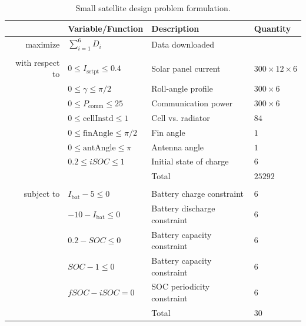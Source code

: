 \documentclass[]{aiaa-tc} %
\begin{document}
    \begin{table}
        \centering
        \caption{Small satellite design problem formulation.}
        \begin{tabular}{r l l l}
            \toprule
            & Variable/Function & Description & Quantity \\
            \midrule
            maximize            & $\sum_{i=1}^6 D_i$ & Data downloaded \\
            \\
            with respect to & $0 \le I_\text{setpt} \le 0.4$ & Solar panel current & $300 \times 12 \times 6$ \\
                                    & $0 \le \gamma \le \pi / 2$ & Roll-angle profile & $300 \times 6$ \\
                                    & $0 \le P_\text{comm} \le 25$ & Communication power & $300 \times 6$ \\
                                    & $0 \le \text{cellInstd} \le 1$ & Cell vs. radiator & $84$ \\
                                    & $0 \le \text{finAngle} \le \pi / 2$ & Fin angle & $1$ \\
                                    & $0 \le \text{antAngle} \le \pi$ & Antenna angle & $1$ \\
                                    & $0.2 \le iSOC \le 1$ & Initial state of charge & $6$ \\
                                    & & Total & $25292$ \\
            \\
            subject to          & $I_\text{bat} - 5 \le 0$ & Battery charge constraint & $6$ \\
                                    & $-10 - I_\text{bat} \le 0$ & Battery discharge constraint & $6$ \\
                                    & $0.2 - SOC \le 0$ & Battery capacity constraint & $6$ \\
                                    & $SOC - 1 \le 0$ & Battery capacity constraint & $6$ \\
                                    & $fSOC - iSOC = 0$ & SOC periodicity constraint & $6$ \\
                                    & & Total & $30$ \\
            \bottomrule
        \end{tabular}
        
        \label{eqn:cadre_formulation}
    \end{table}
\end{document}
